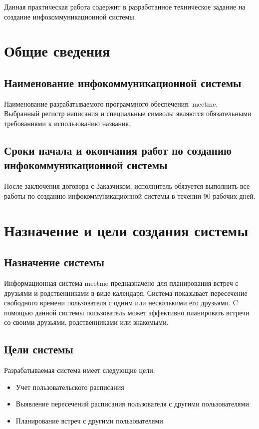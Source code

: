 \documentclass[14pt]{extreport}
\begin{document}
\pagestyle{empty} %



\pagestyle{plain} %
\tableofcontents
\intro\label{intro} 

    Данная практическая работа содержит в разработанное техническое задание на создание инфокоммуникационной системы.


\chapter{Общие сведения}
    \section{Наименование инфокоммуникационной системы}
        Наименование разрабатываемого программного обеспечения: meet\textunderscore me. Выбранный регистр написания и специальные символы являются обязательными требованиями к использованию названия. 
    \section{Сроки начала и окончания работ по созданию инфокоммуникационной системы}
        После заключения договора с Заказчиком, исполнитель обязуется выполнить все работы по созданию инфокоммуникационной системы в течении 90 рабочих дней.

\chapter{Назначение и цели создания системы}
    \section{Назначение системы}
        Информационная система meet\textunderscore me предназначено для планирования встреч с друзьями и родственниками в виде календаря. 
        Система показывает пересечение свободного времени пользователя с одним или несколькими его друзьями.
        C помощью данной системы пользователь может эффективно планировать встречи со своими друзьями, родственниками или знакомыми.

    \section{Цели системы}
        Разрабатываемая  система имеет следующие цели:
        \begin{itemize}
            \item Учет пользовательского расписания
            \item Выявление пересечений расписания пользователя с другими пользователями 
            \item Планирование встреч с другими пользователями 
        \end{itemize}
\end{document}
